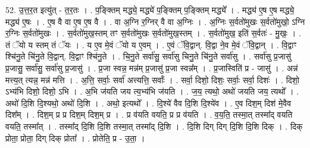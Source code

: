 \documentclass[17pt]{extarticle}
\begin{document}
52. उ॒त्त॒र॒त इत्यु॑त् - त॒र॒तः । . प॒ङ्क्तिम् मद्ध्ये॒ मद्ध्ये॑ प॒ङ्क्तिम् प॒ङ्क्तिम् मद्ध्ये᳚ । . मद्ध्य॑ ए॒ष ए॒ष मद्ध्ये॒ मद्ध्य॑ ए॒षः । . ए॒ष वै वा ए॒ष ए॒ष वै । . वा अ॒ग्नि र॒ग्निर् वै वा अ॒ग्निः । . अ॒ग्निः स॒र्वतो॑मुखः स॒र्वतो॑मुखो॒ ऽग्नि र॒ग्निः स॒र्वतो॑मुखः । . स॒र्वतो॑मुख॒स्तम् तꣳ स॒र्वतो॑मुखः स॒र्वतो॑मुख॒स्तम् । . स॒र्वतो॑मुख॒ इति॑ स॒र्वतः॑ - मु॒खः॒ । . तं ॅयो य स्तम् तं ॅयः । . य ए॒व मे॒वं ॅयो य ए॒वम् । . ए॒वं ॅवि॒द्वान्. वि॒द्वा ने॒व मे॒वं ॅवि॒द्वान् । . वि॒द्वाꣳ श्चि॑नु॒ते चि॑नु॒ते वि॒द्वान्. वि॒द्वाꣳ श्चि॑नु॒ते । . चि॒नु॒ते सर्वा॑सु॒ सर्वा॑सु चिनु॒ते चि॑नु॒ते सर्वा॑सु । . सर्वा॑सु प्र॒जासु॑ प्र॒जासु॒ सर्वा॑सु॒ सर्वा॑सु प्र॒जासु॑ । . प्र॒जा स्वन्न॒ मन्न॑म् प्र॒जासु॑ प्र॒जा स्वन्न᳚म् । . प्र॒जास्विति॑ प्र - जासु॑ । . अन्न॑ मत्त्य॒त् त्यन्न॒ मन्न॑ मत्ति । . अ॒त्ति॒ सर्वाः॒ सर्वा॑ अत्त्यत्ति॒ सर्वाः᳚ । . सर्वा॒ दिशो॒ दिशः॒ सर्वाः॒ सर्वा॒ दिशः॑ । . दिशो॒ ऽभ्य॑भि दिशो॒ दिशो॒ ऽभि । . अ॒भि ज॑यति जय त्य॒भ्य॑भि ज॑यति । . ज॒य॒ त्यथो॒ अथो॑ जयति जय॒ त्यथो᳚ । . अथो॑ दि॒शि दि॒श्यथो॒ अथो॑ दि॒शि । . अथो॒ इत्यथो᳚ । . दि॒श्ये॑ वैव दि॒शि दि॒श्ये॑व । . ए॒व दिश॒म् दिश॑ मे॒वैव दिश᳚म् । . दिश॒म् प्र प्र दिश॒म् दिश॒म् प्र । . प्र व॑यति वयति॒ प्र प्र व॑यति । . व॒य॒ति॒ तस्मा॒त् तस्मा᳚द् वयति वयति॒ तस्मा᳚त् । . तस्मा᳚द् दि॒शि दि॒शि तस्मा॒त् तस्मा᳚द् दि॒शि । . दि॒शि दिग् दिग् दि॒शि दि॒शि दिक् । . दिक् प्रोता॒ प्रोता॒ दिग् दिक् प्रोता᳚ । . प्रोतेति॒ प्र - उ॒ता॒ । \newline
\end{document}

